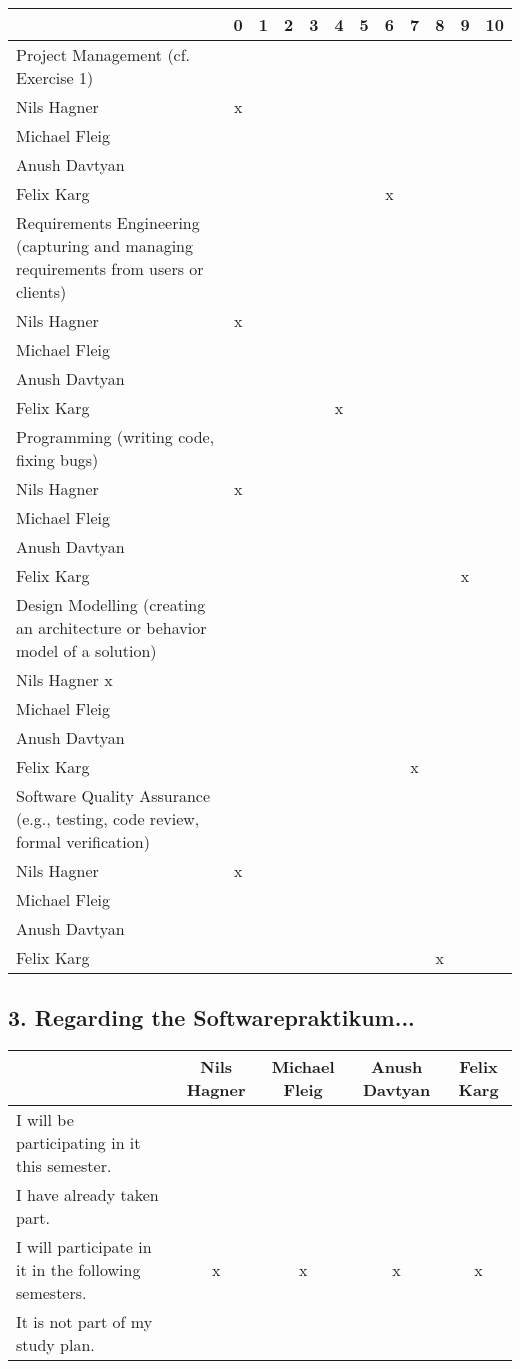 \documentclass{scrartcl}
\begin{document}
\begin{tabular}{| p{10cm} | c | c | c | c | c | c | c | c | c | c | c |}
	\hline
	& 0& 1& 2& 3& 4& 5& 6& 7& 8& 9& 10\\
	\hline
	Project Management (cf. Exercise 1) \\
	\hline
	Nils Hagner &x&&&&&&&&&\\ \hline
	Michael Fleig &&&&&&&&&&\\ \hline
	Anush Davtyan &&&&&&&&&&\\ \hline
	Felix Karg &&&&&&&x&&&\\ \hline
	Requirements Engineering (capturing and managing requirements from users or clients)\\
	\hline
	Nils Hagner &x&&&&&&&&&\\ \hline
	Michael Fleig &&&&&&&&&&\\ \hline
	Anush Davtyan &&&&&&&&&&\\ \hline
	Felix Karg &&&&&x&&&&&\\ \hline
	Programming (writing code, fixing bugs)\\
	\hline
	Nils Hagner &x&&&&&&&&&\\ \hline
	Michael Fleig &&&&&&&&&&\\ \hline
	Anush Davtyan &&&&&&&&&&\\ \hline
	Felix Karg &&&&&&&&&&x\\ \hline
	Design Modelling (creating an architecture or behavior model of a solution)\\
	\hline
	Nils Hagner x&&&&&&&&&&\\ \hline
	Michael Fleig &&&&&&&&&&\\ \hline
	Anush Davtyan &&&&&&&&&&\\ \hline
	Felix Karg &&&&&&&&x&&\\ \hline
	Software Quality Assurance (e.g., testing, code review, formal verification)\\
	\hline
	Nils Hagner &x&&&&&&&&&\\ \hline
	Michael Fleig &&&&&&&&&&\\ \hline
	Anush Davtyan &&&&&&&&&&\\ \hline
	Felix Karg &&&&&&&&&x&\\ \hline
\end{tabular}


\subsection*{3. Regarding the Softwarepraktikum...}
\begin{tabular} {| p{8cm} | c | c | c | c |}
	\hline
	&Nils Hagner&Michael Fleig&Anush Davtyan&Felix Karg\\
	\hline
	I will be participating in it this semester. &&&&\\
	\hline
	I have already taken part. &&&&\\
	\hline
	I will participate in it in the following semesters. &x&x&x&x\\
	\hline
	It is not part of my study plan. &&&&\\
	\hline
\end{tabular}
\end{document}
